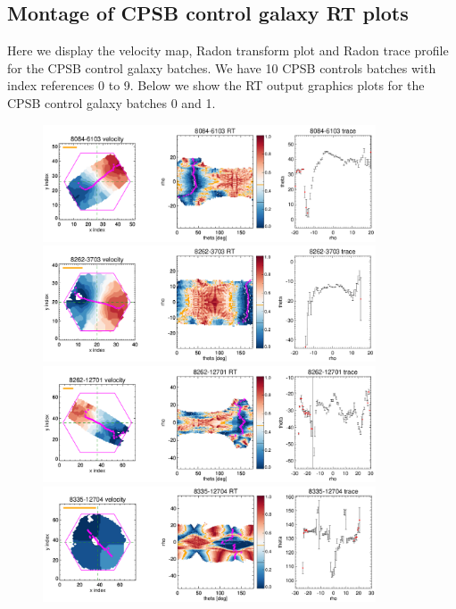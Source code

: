 \documentclass[fleqn,usenatbib]{mnras}
\begin{document}
\subsection{Montage of CPSB control galaxy RT plots}
Here we display the velocity map, Radon transform plot and Radon trace profile for the CPSB control galaxy batches. We have 10 CPSB controls batches with index references 0 to 9. Below we show the RT output graphics plots for the CPSB control galaxy batches 0 and 1.

\begin{figure}
    \centering
    \includegraphics[width=0.88\textwidth]{Images/SN1-MC250/CPSB-CTRL-triples/CPSB-CTRL-8084-6103-1-250.png}
    \includegraphics[width=0.88\textwidth]{Images/SN1-MC250/CPSB-CTRL-triples/CPSB-CTRL-8262-3703-1-250.png}
    \includegraphics[width=0.88\textwidth]{Images/SN1-MC250/CPSB-CTRL-triples/CPSB-CTRL-8262-12701-1-250.png}
    \includegraphics[width=0.88\textwidth]{Images/SN1-MC250/CPSB-CTRL-triples/CPSB-CTRL-8335-12704-1-250.png}    

\end{figure}
\end{document}
